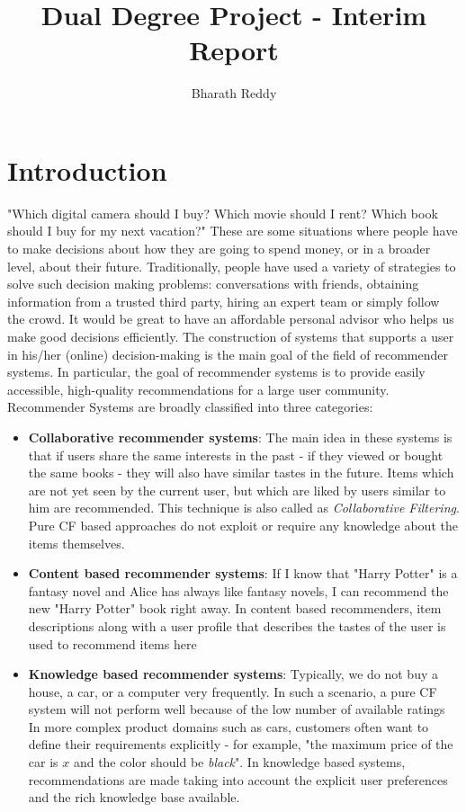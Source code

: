 \documentclass{llncs}
\begin{document}
\title{Dual Degree Project - Interim Report}
\author{Bharath Reddy}
\maketitle
%
\section{Introduction}
"Which digital camera should I buy? Which movie should I rent? Which book should I buy for my next vacation?" These are some situations where people have to make decisions about how they are going to spend money, or in a broader level, about their future.
Traditionally, people have used a variety of strategies to solve such decision making problems: conversations with friends, obtaining information from a trusted third party, hiring an expert team or simply follow the crowd. It would be great to have an affordable personal advisor who helps us make good decisions efficiently.
The construction of systems that supports a user in his/her (online) decision-making is the main goal of the field of recommender systems. In particular, the goal of recommender systems is to provide easily accessible, high-quality recommendations for a large user community. \\
      Recommender Systems are broadly classified into three categories:
\begin{itemize}
\renewcommand{\labelitemi}{$\bullet$}
\item \textbf{Collaborative recommender systems}: The main idea in these systems is that if users share the same interests in the past - if they viewed or bought the same books - they will also have similar tastes in the future. Items which are not yet seen by the current user, but which are liked by users similar to him are recommended. This technique is also called as \textit{Collaborative Filtering}. Pure CF based approaches do not exploit or require any knowledge about the items themselves.

\item \textbf{Content based recommender systems}: If I know that "Harry Potter" is a fantasy novel and Alice has always like fantasy novels, I can recommend the new "Harry Potter" book right away. 
In content based recommenders, item descriptions along with a user profile that describes the tastes of the user is used to recommend items here

\item \textbf{Knowledge based recommender systems}: Typically, we do not buy a house, a car, 
or a computer very frequently. In such a scenario, a pure CF system will not perform well because of the low number of available ratings
In more complex product domains such as cars, customers often want to define their requirements explicitly - for example, "the maximum price of the car is $x$ and the color should be \textit{black}". In knowledge based systems, recommendations are made taking into account the explicit user preferences and the rich knowledge base available.
\end{itemize}
\end{document}
